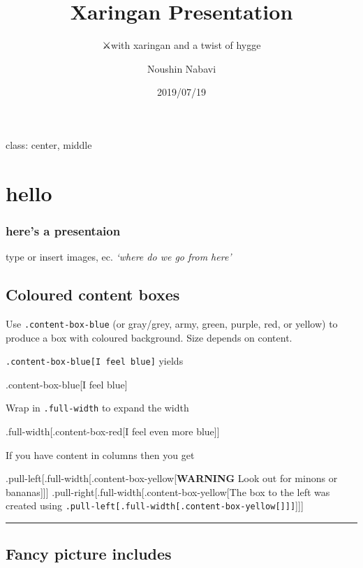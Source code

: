 \documentclass[]{article}
\title{Xaringan Presentation}
\subtitle{⚔with xaringan and a twist of hygge}
\author{Noushin Nabavi}
\date{2019/07/19}
\begin{document}
\maketitle

class: center, middle

\hypertarget{hello}{%
\section{hello}\label{hello}}

\hypertarget{heres-a-presentaion}{%
\subsubsection{here's a presentaion}\label{heres-a-presentaion}}

type or insert images, ec. \emph{`where do we go from here'}

\hypertarget{coloured-content-boxes}{%
\subsection{Coloured content boxes}\label{coloured-content-boxes}}

Use \texttt{.content-box-blue} (or gray/grey, army, green, purple, red,
or yellow) to produce a box with coloured background. Size depends on
content.

\texttt{.content-box-blue{[}I\ feel\ blue{]}} yields

.content-box-blue{[}I feel blue{]}

Wrap in \texttt{.full-width} to expand the width

.full-width{[}.content-box-red{[}I feel even more blue{]}{]}

If you have content in columns then you get

.pull-left{[}.full-width{[}.content-box-yellow{[}\textbf{WARNING} Look
out for minons or bananas{]}{]}{]}
.pull-right{[}.full-width{[}.content-box-yellow{[}The box to the left
was created using
\texttt{.pull-left{[}.full-width{[}.content-box-yellow{[}{]}{]}{]}}{]}{]}{]}

\begin{center}\rule{0.5\linewidth}{0.5pt}\end{center}

\hypertarget{fancy-picture-includes}{%
\subsection{Fancy picture includes}\label{fancy-picture-includes}}
\end{document}
